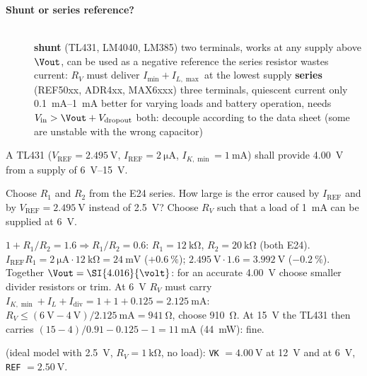 \begin{description}
\item[{\rot\bf Shunt or series reference?}]~\\[-\lblskip]
\bi
	\ite \textbf{shunt} (TL431, LM4040, LM385)
	\itee two terminals, works at any supply above $\Vout$, can be used as a negative reference
	\itee the series resistor wastes current: $R_V$ must deliver $I_\mathrm{min} + I_{L,\max}$ at the lowest supply
	\ite \textbf{series} (REF50xx, ADR4xx, MAX6xxx)
	\itee three terminals, quiescent current only \SIrange{0.1}{1}{\milli\ampere}
	\itee better for varying loads and battery operation, needs $V_\mathrm{in} > \Vout + V_\mathrm{dropout}$
	\ite both: decouple according to the data sheet (some are unstable with the wrong capacitor)
\ei
\os{\newpage}
\end{description}

A TL431 ($V_\mathrm{REF} = \SI{2.495}{\volt}$, $I_\mathrm{REF} = \SI{2}{\micro\ampere}$,
$I_{K,\min} = \SI{1}{\milli\ampere}$) shall provide \SI{4.00}{\volt} from a
supply of \SIrange{6}{15}{\volt}.
\begin{talist}
\ta Choose $R_1$ and $R_2$ from the E24 series.
\ta How large is the error caused by $I_\mathrm{REF}$ and by $V_\mathrm{REF} = \SI{2.495}{\volt}$ instead of \SI{2.5}{\volt}?
\ta Choose $R_V$ such that a load of \SI{1}{\milli\ampere} can be supplied at \SI{6}{\volt}.
\end{talist}

\begin{solution}
\begin{talist}
\ta $1+R_1/R_2 = 1.6 \Rightarrow R_1/R_2 = 0.6$: $R_1 = \SI{12}{\kilo\ohm}$, $R_2 = \SI{20}{\kilo\ohm}$ (both E24).
\ta $I_\mathrm{REF}R_1 = \SI{2}{\micro\ampere}\cdot\SI{12}{\kilo\ohm} = \SI{24}{\milli\volt}$ ($+\SI{0.6}{\percent}$);
	$\SI{2.495}{\volt}\cdot 1.6 = \SI{3.992}{\volt}$ ($-\SI{0.2}{\percent}$). Together $\Vout = \SI{4.016}{\volt}$:
	for an accurate \SI{4.00}{\volt} choose smaller divider resistors or trim.
\ta At \SI{6}{\volt} $R_V$ must carry $I_{K,\min} + I_L + I_\mathrm{div} = 1 + 1 + 0.125 = \SI{2.125}{\milli\ampere}$:
	$R_V \le (\SI{6}{\volt}-\SI{4}{\volt})/\SI{2.125}{\milli\ampere} = \SI{941}{\ohm}$, choose \SI{910}{\ohm}.
	At \SI{15}{\volt} the TL431 then carries $(15-4)/0.91 - 0.125 - 1 = \SI{11}{\milli\ampere}$ (\SI{44}{\milli\watt}): fine.
\item[]  (ideal model with \SI{2.5}{\volt}, $R_V = \SI{1}{\kilo\ohm}$, no load):
	\texttt{VK} $=\SI{4.00}{\volt}$ at \SI{12}{\volt} and at \SI{6}{\volt}, \texttt{REF} $= \SI{2.50}{\volt}$.
\end{talist}
\end{solution}

